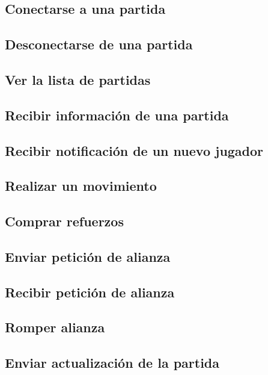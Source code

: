 \subsection{Conectarse a una partida}

\subsection{Desconectarse de una partida}

\subsection{Ver la lista de partidas}

\subsection{Recibir información de una partida}

\subsection{Recibir notificación de un nuevo jugador}

\subsection{Realizar un movimiento}

\subsection{Comprar refuerzos}

\subsection{Enviar petición de alianza}

\subsection{Recibir petición de alianza}

\subsection{Romper alianza}

\subsection{Enviar actualización de la partida}

